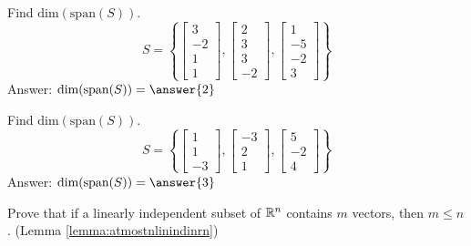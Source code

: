 \documentclass{ximera}
\begin{document}
\begin{problem}\label{prob:finddimension2}
Find $\mbox{dim}(\mbox{span}(S))$.
$$S=\left\{\begin{bmatrix}3\\-2\\1\\1\end{bmatrix}, \begin{bmatrix}2\\3\\3\\-2\end{bmatrix}, \begin{bmatrix}1\\-5\\-2\\3\end{bmatrix}\right\}$$
Answer: $\mbox{dim}(\mbox{span}(S))=\answer{2}$
\end{problem}

\begin{problem}\label{prob:finddimension3}
Find $\mbox{dim}(\mbox{span}(S))$.
$$S=\left\{\begin{bmatrix}1\\1\\-3\end{bmatrix}, \begin{bmatrix}-3\\2\\1\end{bmatrix}, \begin{bmatrix}5\\-2\\4\end{bmatrix}\right\}$$
Answer: $\mbox{dim}(\mbox{span}(S))=\answer{3}$
\end{problem}


\begin{problem}\label{prob:atmostnlinindinrnproof}
Prove that if a linearly independent subset of $\mathbb{R}^n$ contains $m$ vectors, then $m\leq n$. (Lemma \ref{lemma:atmostnlinindinrn})
\end{problem}

\end{document}
